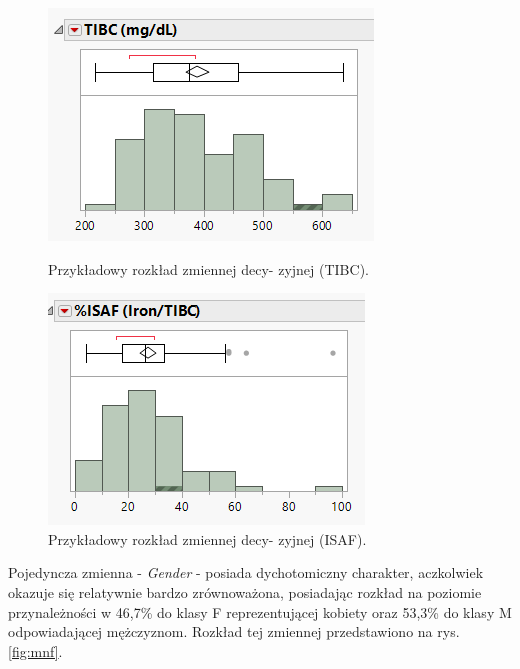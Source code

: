	\begin{figure}[!ht]
		\begin{minipage}{0.40\textwidth}
			\centering
			\includegraphics[width=0.9\linewidth]{Rozdzial3/decision}
			\caption{Przykładowy rozkład zmiennej decy- zyjnej (TIBC).}
			\label{fig:decision}		
		\end{minipage}%
		\hspace{0.10\textwidth}
		\begin{minipage}{0.40\textwidth}
			\centering
			\includegraphics[width=0.9\linewidth]{Rozdzial3/decision1}
			\caption{Przykładowy rozkład zmiennej decy- zyjnej (ISAF).}
			\label{fig:decision1}			
		\end{minipage}
	\end{figure}
	
	Pojedyncza zmienna - \textit{Gender} - posiada dychotomiczny charakter, aczkolwiek okazuje się relatywnie bardzo zrównoważona, posiadając rozkład na poziomie przynależności w 46,7\% do klasy F reprezentującej kobiety oraz 53,3\% do klasy M odpowiadającej mężczyznom. Rozkład tej zmiennej przedstawiono na rys. \ref{fig:mnf}.
	
